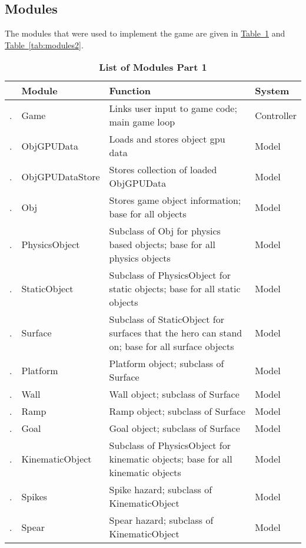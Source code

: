 \documentclass[12pt, titlepage]{article}
\newcounter{ModList}
\newcommand{\printMod}{
    \stepcounter{ModList}
    \arabic{ModList}.
}
\begin{document}
\subsection{Modules}
The modules that were used to implement the game are given in \hyperref[tab:modules]{Table~\ref*{tab:modules}} and \hyperref[tab:modules2]{Table~\ref*{tab:modules2}}.

\begin{table}[h]
\caption{\bf List of Modules Part 1} \label{tab:modules}
\begin{tabularx}{\textwidth}{p{0.4cm}p{3.5cm}p{6cm}X}
\toprule & {\bf Module} & {\bf Function} & {\bf System}\\
\midrule
\printMod & Game & Links user input to game code; main game loop & Controller\\
\printMod & ObjGPUData & Loads and stores object gpu data & Model\\
\printMod & ObjGPUDataStore & Stores collection of loaded ObjGPUData & Model\\
\printMod & Obj & Stores game object information; base for all objects & Model\\
\printMod & PhysicsObject & Subclass of Obj for physics based objects; base for all physics objects & Model\\
\printMod & StaticObject & Subclass of PhysicsObject for static objects; base for all static objects & Model\\
\printMod & Surface & Subclass of StaticObject for surfaces that the hero can stand on; base for all surface objects & Model\\
\printMod & Platform & Platform object; subclass of Surface & Model\\
\printMod & Wall & Wall object; subclass of Surface & Model\\
\printMod & Ramp & Ramp object; subclass of Surface & Model\\
\printMod & Goal & Goal object; subclass of Surface & Model\\
\printMod & KinematicObject & Subclass of PhysicsObject for kinematic objects; base for all kinematic objects & Model\\
\printMod & Spikes & Spike hazard; subclass of KinematicObject & Model\\
\printMod & Spear & Spear hazard; subclass of KinematicObject & Model\\
\bottomrule
\end{tabularx}
\end{table}
\end{document}
